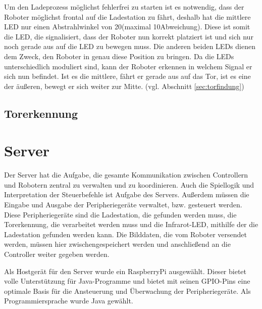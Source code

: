 Um den Ladeprozess möglichst fehlerfrei zu starten ist es notwendig, dass der Roboter möglichst frontal auf die Ladestation zu fährt, deshalb hat die mittlere LED nur einen Abstrahlwinkel von 20\degree  (maximal 10\degree  Abweichung). Diese ist somit die LED, die signalisiert, dass der Roboter nun korrekt platziert ist und sich nur noch gerade aus auf die LED zu bewegen muss. Die anderen beiden LEDs dienen dem Zweck, den Roboter in genau diese Position zu bringen. Da die LEDs unterschiedlich moduliert sind, kann der Roboter erkennen in welchem Signal er sich nun befindet. Ist es die mittlere, fährt er gerade aus auf das Tor, ist es eine der äußeren, bewegt er sich weiter zur Mitte. (vgl. Abschnitt \ref{sec:torfindung})

\subsection{Torerkennung}

\section{Server}
\label{impl:server}
Der Server hat die Aufgabe, die gesamte Kommunikation zwischen Controllern und Robotern zentral zu verwalten und zu koordinieren. Auch die Spiellogik und Interpretation der Steuerbefehle ist Aufgabe des Servers. Außerdem müssen die Eingabe und Ausgabe der Peripheriegeräte verwaltet, bzw. gesteuert werden. Diese Peripheriegeräte sind die Ladestation, die gefunden werden muss, die Torerkennung, die verarbeitet werden muss und die Infrarot-LED, mithilfe der die Ladestation gefunden werden kann. Die Bilddaten, die vom Roboter versendet werden, müssen hier zwischengespeichert werden und anschließend an die Controller weiter gegeben werden.

Als Hostgerät für den Server wurde ein RaspberryPi ausgewählt. Dieser bietet volle Unterstützung für Java-Programme und bietet mit seinen GPIO-Pins eine optimale Basis für die Ansteuerung und Überwachung der Peripheriegeräte. 
Als Programmiersprache wurde Java gewählt.


